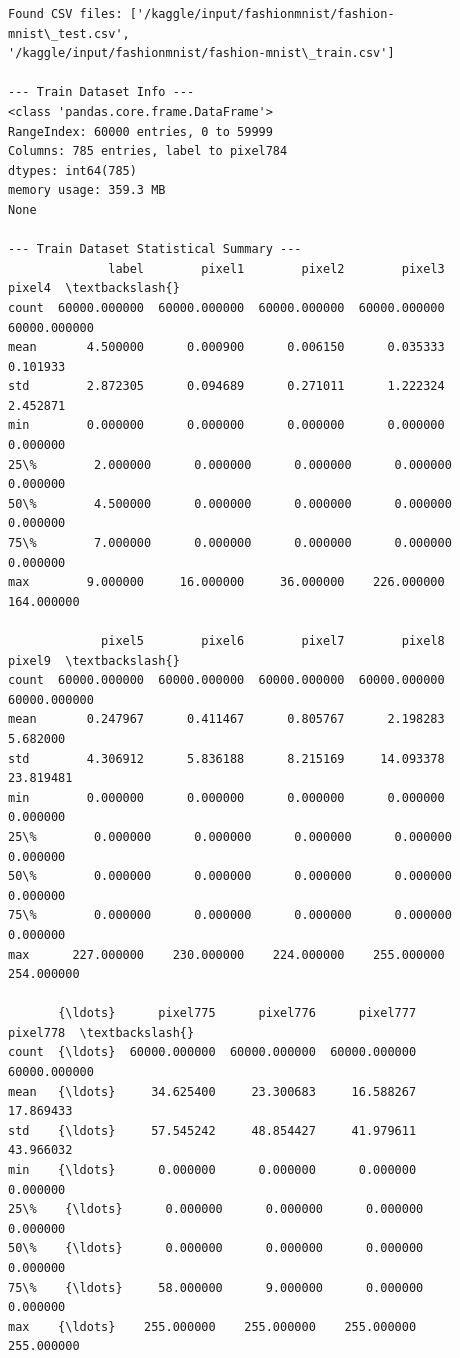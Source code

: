 \documentclass[11pt]{article}
\begin{document}
    \begin{Verbatim}[commandchars=\\\{\}]
Found CSV files: ['/kaggle/input/fashionmnist/fashion-mnist\_test.csv',
'/kaggle/input/fashionmnist/fashion-mnist\_train.csv']

--- Train Dataset Info ---
<class 'pandas.core.frame.DataFrame'>
RangeIndex: 60000 entries, 0 to 59999
Columns: 785 entries, label to pixel784
dtypes: int64(785)
memory usage: 359.3 MB
None

--- Train Dataset Statistical Summary ---
              label        pixel1        pixel2        pixel3        pixel4  \textbackslash{}
count  60000.000000  60000.000000  60000.000000  60000.000000  60000.000000
mean       4.500000      0.000900      0.006150      0.035333      0.101933
std        2.872305      0.094689      0.271011      1.222324      2.452871
min        0.000000      0.000000      0.000000      0.000000      0.000000
25\%        2.000000      0.000000      0.000000      0.000000      0.000000
50\%        4.500000      0.000000      0.000000      0.000000      0.000000
75\%        7.000000      0.000000      0.000000      0.000000      0.000000
max        9.000000     16.000000     36.000000    226.000000    164.000000

             pixel5        pixel6        pixel7        pixel8        pixel9  \textbackslash{}
count  60000.000000  60000.000000  60000.000000  60000.000000  60000.000000
mean       0.247967      0.411467      0.805767      2.198283      5.682000
std        4.306912      5.836188      8.215169     14.093378     23.819481
min        0.000000      0.000000      0.000000      0.000000      0.000000
25\%        0.000000      0.000000      0.000000      0.000000      0.000000
50\%        0.000000      0.000000      0.000000      0.000000      0.000000
75\%        0.000000      0.000000      0.000000      0.000000      0.000000
max      227.000000    230.000000    224.000000    255.000000    254.000000

       {\ldots}      pixel775      pixel776      pixel777      pixel778  \textbackslash{}
count  {\ldots}  60000.000000  60000.000000  60000.000000  60000.000000
mean   {\ldots}     34.625400     23.300683     16.588267     17.869433
std    {\ldots}     57.545242     48.854427     41.979611     43.966032
min    {\ldots}      0.000000      0.000000      0.000000      0.000000
25\%    {\ldots}      0.000000      0.000000      0.000000      0.000000
50\%    {\ldots}      0.000000      0.000000      0.000000      0.000000
75\%    {\ldots}     58.000000      9.000000      0.000000      0.000000
max    {\ldots}    255.000000    255.000000    255.000000    255.000000


\end{Verbatim}
\end{document}

